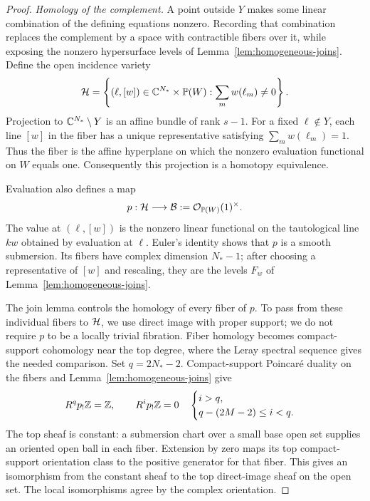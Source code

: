 \begin{proof}
\emph{Homology of the complement.}
A point outside \(Y\) makes some linear combination of the defining
equations nonzero.  Recording that combination replaces the complement
by a space with contractible fibers over it, while exposing the
nonzero hypersurface levels of Lemma~\ref{lem:homogeneous-joins}.
Define the open incidence variety
\[
 \mathcal H=\left\{(\ell,[w])\in\mathbb C^{N_*}\times\mathbb P(W):
                         \sum_m w(\ell_m)\ne0\right\}.
\]
Projection to \(\mathbb C^{N_*}\setminus Y\) is an affine bundle of rank
\(s-1\).  For a fixed \(\ell\notin Y\), each line \([w]\) in the
fiber has a unique representative satisfying \(\sum_m w(\ell_m)=1\).
Thus the fiber is the affine hyperplane on which the nonzero evaluation
functional on \(W\) equals one.
Consequently this projection is a homotopy equivalence.

Evaluation also defines a map
\[
 p:\mathcal H\longrightarrow
 \mathcal B:=\mathcal O_{\mathbb P(W)}(1)^\times.
\]
The value at \((\ell,[w])\) is the nonzero linear functional on the
tautological line \(kw\) obtained by evaluation at \(\ell\).
Euler's identity shows that \(p\) is a smooth submersion.
Its fibers have complex dimension \(N_*-1\); after choosing a
representative of \([w]\) and rescaling, they are the levels
\(F_w\) of Lemma~\ref{lem:homogeneous-joins}.

The join lemma controls the homology of every fiber of \(p\).
To pass from these individual fibers to \(\mathcal H\), we use direct image
with proper support; we do not require \(p\) to be a locally trivial
fibration.  Fiber homology becomes compact-support cohomology near
the top degree, where the Leray spectral sequence gives the needed
comparison.  Set \(q=2N_*-2\).  Compact-support Poincar\'e duality on
the fibers \cite[Theorem~3.35]{HatcherAT} and
Lemma~\ref{lem:homogeneous-joins} give
\begin{equation}
 R^q p_!\mathbb Z=\mathbb Z,\qquad
 R^i p_!\mathbb Z=0\quad
 \begin{cases}
 i>q,\\
 q-(2M-2)\le i<q.
 \end{cases}
 \label{eq:parameter-support-rows}
\end{equation}
The top sheaf is constant: a submersion
chart over a small base open set supplies an oriented open ball
in each fiber.  Extension by zero maps its top compact-support
orientation class to the positive generator for that fiber.
This gives an isomorphism from the constant sheaf to the top
direct-image sheaf on the open set.  The local isomorphisms agree
by the complex orientation.


\end{proof}
